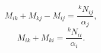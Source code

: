 $$M_{ik} + M_{kj} - M_{ij} = \frac{\,^{k}\!N_{ij}}{\alpha_j},$$
$$M_{ik} + M_{ki} = \frac{\,^{k}\!N_{ii}}{\alpha_i}.$$
